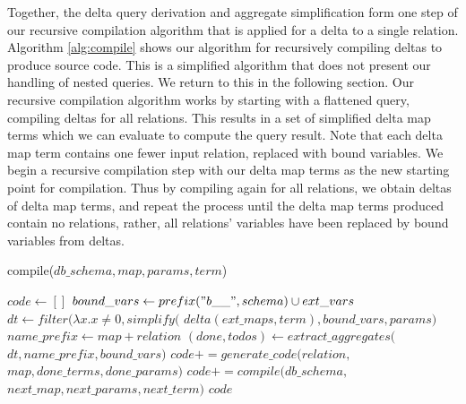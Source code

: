 Together, the delta query derivation and aggregate simplification form one step
of our recursive compilation algorithm that is applied for a delta to a single
relation. 
Algorithm \ref{alg:compile} shows our algorithm for recursively compiling deltas
to produce source code. This is a simplified algorithm that does not present our
handling of nested queries. We return to this in the following section.
Our recursive compilation algorithm works by starting with a flattened
query, compiling deltas for all relations. This results in a set of simplified
delta map terms which we can evaluate to compute the query result. Note that
each delta map term contains one fewer input relation, replaced with bound
variables. We begin a recursive compilation step with our delta map
terms as the new starting point for compilation. Thus by compiling again for
all relations, we obtain deltas of delta map terms, and repeat the process until
the delta map terms produced contain no relations, rather, all relations'
variables have been replaced by bound variables from deltas.

\newcommand{\indentcode}{\hspace{5mm}}
\begin{algorithm}
\caption{compile($db\_schema, map, params, term$)}
\label{alg:compile}
\begin{algorithmic}[1]
\STATE $code \leftarrow []$
  \STATE {}
  \STATE $bound\_vars \leftarrow prefix("b\_\_", schema) \cup ext\_vars$
  \STATE $dt \leftarrow filter(\lambda x. x \neq 0, simplify($
    \STATE \indentcode $delta(ext\_maps,term),bound\_vars, params)$
  \STATE $name\_prefix \leftarrow map+relation$
  \STATE $(done, todos) \leftarrow extract\_aggregates($
    \STATE \indentcode $dt, name\_prefix, bound\_vars)$
     \STATE $code += generate\_code(relation,$
     \STATE \indentcode $map, done\_terms, done\_params)$
  \ENDFOR
  \STATE {}
  \STATE $code += compile(db\_schema, $
  \STATE \indentcode $next\_map, next\_params, next\_term)$
  \ENDFOR
\ENDFOR
\RETURN $code$
\end{algorithmic}
\end{algorithm}

